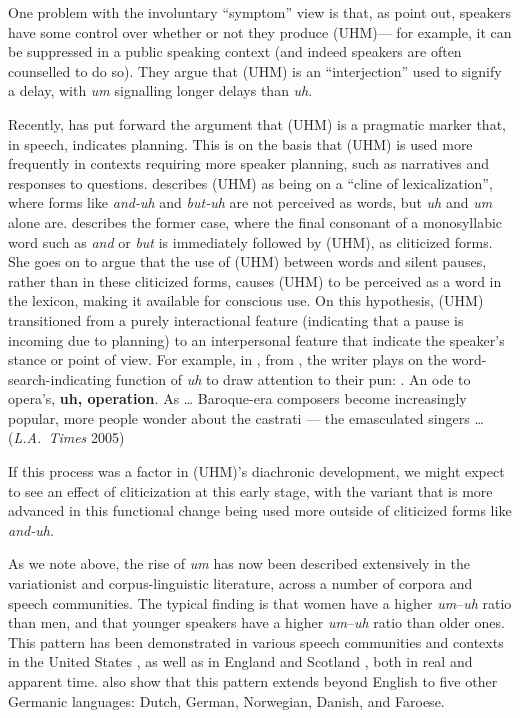 \documentclass[11pt]{article}
\begin{document}
One problem with the involuntary ``symptom'' view is that, as
\textcite{clarkfoxtree2002} point out, speakers have some control over whether
or not they produce (UHM)---%
for example, it can be suppressed in a public speaking context (and indeed
speakers are often counselled to do so).
They argue that (UHM) is an ``interjection'' used to signify a delay, with
\emph{um} signalling longer delays than \emph{uh}.

Recently, \textcite{tottie2016} has put forward the argument that
(UHM) is a pragmatic marker that, in speech, indicates planning.
This is on the basis that (UHM) is used more frequently in contexts requiring
more speaker planning, such as narratives and responses to questions.
\textcite{tottie2017} describes (UHM) as being on a ``cline of lexicalization'',
where forms like \emph{and-uh} and \emph{but-uh} are not perceived as words, but
\emph{uh} and \emph{um} alone are.
\textcite[21--22]{tottie2017} describes the former case, where the final
consonant of a monosyllabic word such as \emph{and} or \emph{but} is immediately
followed by (UHM), as cliticized forms.
She goes on to argue that the use of (UHM) between words and silent pauses,
rather than in these cliticized forms, causes (UHM) to be perceived as a word in
the lexicon, making it available for conscious use.
On this hypothesis, (UHM) transitioned from a purely interactional feature
(indicating that a pause is incoming due to planning) to an interpersonal
feature that indicate the speaker's stance or point of view.
For example, in \Next, from \textcite[:~(2)]{tottie2017}, the writer plays on
the word-search-indicating function of \emph{uh} to draw attention to their pun:
\ex. An ode to opera's, \textbf{uh, operation}. As \ldots{} Baroque-era
composers become increasingly popular, more people wonder about the castrati ---
the emasculated singers \ldots{} (\emph{L.A.~Times} 2005)

If this process was a factor in (UHM)'s diachronic development, we might expect
to see an effect of cliticization at this early stage, with the variant that is
more advanced in this functional change being used more outside of cliticized
forms like \emph{and-uh}.

As we note above, the rise of \emph{um} has now been described extensively in
the variationist and corpus-linguistic literature, across a number of corpora
and speech communities.
The typical finding is that women have a higher \emph{um}--\emph{uh} ratio than
men, and that younger speakers have a higher \emph{um}--\emph{uh} ratio than
older ones.
This pattern has been demonstrated in various speech communities and contexts in
the United States \parencite{acton2011, fruehwald2016, wielingetal2016,
lasernaetal2014}, as well as in England and Scotland \parencite{tottie2011,
wielingetal2016}, both in real and apparent time.
\textcite{wielingetal2016} also show that this pattern extends beyond English to
five other Germanic languages: Dutch, German, Norwegian, Danish, and Faroese.
\end{document}
